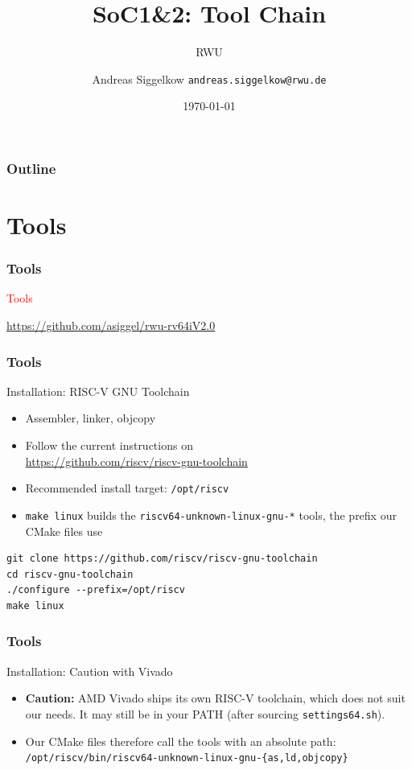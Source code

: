 \documentclass{beamer}
\title{SoC1\&2: Tool Chain}
\author[AS]{Andreas Siggelkow \newline \texttt{andreas.siggelkow@rwu.de}}
\date[2026]{\today}
\subtitle{RWU}
\institute{Elektrotechnik und Informatik}
\newcommand{\astitle}{nix}
\newcommand{\assubtitle}{nix}
\newcommand{\cmd}[1]{\texttt{#1}}
\begin{document}
\setcounter{tocdepth}{1}

\begin{frame}
  \titlepage
\end{frame}

\begin{frame}
  \frametitle{Outline}
  \tableofcontents
\end{frame}

\section{Tools}
\renewcommand{\astitle}{Tools}
\begin{frame}
\frametitle{\astitle}
\textcolor{red}{Tools}

\url{https://github.com/asiggel/rwu-rv64iV2.0}
\end{frame}

\renewcommand{\assubtitle}{Installation: RISC-V GNU Toolchain}
\begin{frame}[fragile]
\frametitle{\astitle}
\begin{block}{\assubtitle}
  \begin{itemize}
    \item Assembler, linker, objcopy
    \item Follow the current instructions on\\
      \url{https://github.com/riscv/riscv-gnu-toolchain}
    \item Recommended install target: \cmd{/opt/riscv}
    \item \cmd{make linux} builds the \cmd{riscv64-unknown-linux-gnu-*} tools,
      the prefix our CMake files use
  \end{itemize}
\begin{lstlisting}[style=sh]
git clone https://github.com/riscv/riscv-gnu-toolchain
cd riscv-gnu-toolchain
./configure --prefix=/opt/riscv
make linux
\end{lstlisting}
\end{block}
\end{frame}

\renewcommand{\assubtitle}{Installation: Caution with Vivado}
\begin{frame}
\frametitle{\astitle}
\begin{block}{\assubtitle}
  \begin{itemize}
    \item \textbf{Caution:} AMD Vivado ships its own RISC-V toolchain, which does not
      suit our needs. It may still be in your PATH (after sourcing \cmd{settings64.sh}).
    \item Our CMake files therefore call the tools with an absolute path:\\
      \cmd{\footnotesize /opt/riscv/bin/riscv64-unknown-linux-gnu-\{as,ld,objcopy\}}
  \end{itemize}
\end{block}
\end{frame}
\end{document}
